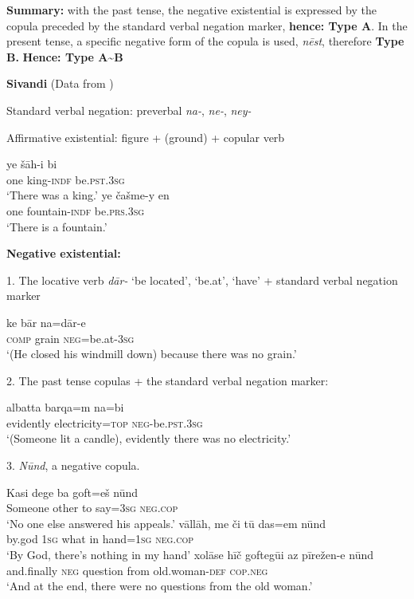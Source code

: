 \documentclass[output=paper]{langsci/langscibook}
\begin{document}
\begin{unindented}
\textbf{Summary:} with the past tense, the negative existential is expressed by the copula preceded by the standard verbal negation marker, \textbf{hence: Type A}. In the present tense, a specific negative form of the copula is used, \textit{nēst}, therefore \textbf{Type B.} \textbf{Hence: Type A{\textasciitilde}B}
%

\textbf{Sivandi} (Data from \citealt{Lecoq1979}) 

Standard verbal negation: preverbal \textit{na-}, \textit{ne-}, \textit{ney-} 

Affirmative existential: figure + (ground) + copular verb
%
\begin{exe}\ex
    \gll ye šāh-i bi \\
one  king-\textsc{indf}    be.\textsc{pst}.\textsc{3sg} \\
    \glt `There was a king.' \citep[107]{Lecoq1979}
\ex \gll ye   čašme-y      en \\
one  fountain-\textsc{indf}   be.\textsc{prs.3sg} \\
    \glt `There is a fountain.' \citep[127]{Lecoq1979}
    \end{exe}

\textbf{Negative existential:}

1. The locative verb \textit{dār-} `be located', `be.at', `have' + standard verbal negation marker
%
\begin{exe}\ex
    \gll ke   bār   na=dār-e \\
\textsc{comp}   grain  \textsc{neg}=be.at-\textsc{3sg} \\
    \glt `(He closed his windmill down) because there was no grain.' \citep[150]{Lecoq1979}
    \end{exe} 

2. The past tense copulas + the standard verbal negation marker:
%
\begin{exe}\ex
    \gll albatta      barqa=m          na=bi \\
evidently  electricity=\textsc{top} \textsc{neg}-be.\textsc{pst.3sg} \\
    \glt `(Someone lit a candle), evidently there was no electricity.' \citep[89]{Lecoq1979}
    \end{exe}
3. \textit{Nūnd}, a negative copula.
%
\begin{exe}\ex
    \gll Kasi dege  ba goft=eš    nūnd           \\
Someone other to say=\textsc{3sg}  \textsc{neg}.\textsc{cop}  \\
    \glt `No one else answered his appeals.' \citep[95]{Lecoq1979}
\ex \gll vāllāh, me    či      tū  das=em      nūnd \\
by.god  \textsc{1sg}   what in hand=\textsc{1sg}    \textsc{neg.cop} \\
    \glt `By God, there's nothing in my hand' \citep[150]{Lecoq1979}
\ex \gll xolāse hīč    goftegūi  az      pīrežen-e          nūnd \\
and.finally \textsc{neg}  question from  old.woman-\textsc{def}   \textsc{cop.neg} \\
    \glt `And at the end, there were no questions from the old woman.' \citep[108]{Lecoq1979}
    \end{exe}


\end{unindented}
\end{document}
